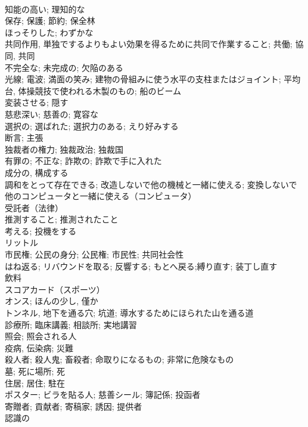 \documentclass[8pt]{extreport}
\begin{document}
\begin{CJK}{UTF8}{min}
\\	知能の高い; 理知的な	
\\	保存; 保護; 節約; 保全林	
\\	ほっそりした; わずかな	
\\	共同作用, 単独でするよりもよい効果を得るために共同で作業すること; 共働; 協同, 共同	
\\	不完全な; 未完成の; 欠陥のある	
\\	光線; 電波; 満面の笑み; 建物の骨組みに使う水平の支柱またはジョイント; 平均台, 体操競技で使われる木製のもの; 船のビーム	
\\	変装させる; 隠す	
\\	慈悲深い; 慈善の; 寛容な	
\\	選択の; 選ばれた; 選択力のある; えり好みする	
\\	断言; 主張	
\\	独裁者の権力; 独裁政治; 独裁国	
\\	有罪の; 不正な; 詐欺の; 詐欺で手に入れた	
\\	成分の, 構成する	
\\	調和をとって存在できる; 改造しないで他の機械と一緒に使える; 変換しないで他のコンピュータと一緒に使える（コンピュータ）	
\\	受託者（法律）
\\	推測すること; 推測されたこと	
\\	考える; 投機をする	
\\	リットル	
\\	市民権; 公民の身分; 公民権; 市民性; 共同社会性	
\\	はね返る; リバウンドを取る; 反響する; もとへ戻る;縛り直す; 装丁し直す	
\\	飲料	
\\	スコアカード（スポーツ）	
\\	オンス; ほんの少し, 僅か	
\\	トンネル, 地下を通る穴; 坑道; 導水するためにほられた山を通る道	
\\	診療所; 臨床講義; 相談所; 実地講習	
\\	照会; 照会される人	
\\	疫病, 伝染病; 災難	
\\	殺人者; 殺人鬼; 畜殺者; 命取りになるもの; 非常に危険なもの	
\\	墓; 死に場所; 死	
\\	住居; 居住; 駐在	
\\	ポスター; ビラを貼る人; 慈善シール; 簿記係; 投函者	
\\	寄贈者; 貢献者; 寄稿家; 誘因; 提供者	
\\	認識の	

\end{CJK}
\end{document}
